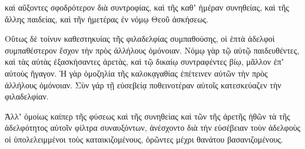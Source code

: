 {καὶ αὔξοντες σφοδρότερον διὰ συντροφίας, καὶ τῆς καθʼ ἠμέραν συνηθείας, καὶ τῆς ἄλλης παιδείας, καὶ τῆν ἡμετέρας ἐν νόμῳ Θεοῦ ἀσκήσεως.
\par }{\PP {}Οὕτως δὲ τοίνυν καθεστηκυίας τῆς φιλαδελφίας συμπαθούσης, οἱ ἑπτὰ ἀδελφοὶ συμπαθέστερον ἔσχον τὴν πρὸς ἀλλήλους ὁμόνοιαν.
Νόμῳ γὰρ τῷ αὐτῷ παιδευθέντες, καὶ τὰς αὐτὰς ἐξασκήσαντες ἀρετὰς, καὶ τῷ δικαίῳ συντραφέντες βίῳ, μᾶλλον ἐπʼ αὐτοὺς ἥγαγον.
Ἡ γὰρ ὁμοζηλία τῆς καλοκᾳγαθίας ἐπέτεινεν αὐτῶν τὴν πρὸς ἀλλήλους ὁμόνοιαν.
Σὺν γάρ τῇ εὐσεβείᾳ ποθεινοτέραν αὐτοῖς κατεσκεύαζεν τὴν φιλαδελφίαν.
\par }{\PP {}Ἀλλʼ ὁμοίως καίπερ τῆς φύσεως καὶ τῆς συνηθείας καὶ τῶν τῆς ἀρετῆς ἠθῶν τὰ τῆς ἀδελφότητος αὐτοῖν φίλτρα συναυξόντων, ἀνέσχοντο διὰ τὴν εὐσέβειαν τοὺν ἀδελφοὺς οἱ ὑπολελειμμένοι τοὺς καταικιζομένους, ὁρῶντες μέχρι θανάτου βασανιζομένους.

}
